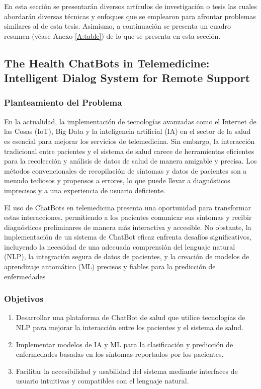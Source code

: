 En esta sección se presentarán diversos artículos de investigación o tesis las cuales abordarán diversas técnicas y enfoques que se emplearon para afrontar problemas similares al de esta tesis. Asimismo, a continuación se presenta un cuadro resumen (véase Anexo \ref{A:table}) de lo que se presenta en esta sección.


\subsection{The Health ChatBots in Telemedicine: Intelligent Dialog System for Remote Support \citep*{HealthChatBots-2022}}
	\subsubsection{Planteamiento del Problema}
		En la actualidad, la implementación de tecnologías avanzadas como el Internet de las Cosas (IoT), Big Data y la inteligencia artificial (IA) en el sector de la salud es esencial para mejorar los servicios de telemedicina. Sin embargo, la interacción tradicional entre pacientes y el sistema de salud carece de herramientas eficientes para la recolección y análisis de datos de salud de manera amigable y precisa. Los métodos convencionales de recopilación de síntomas y datos de pacientes son a menudo tediosos y propensos a errores, lo que puede llevar a diagnósticos imprecisos y a una experiencia de usuario deficiente.
		
		El uso de ChatBots en telemedicina presenta una oportunidad para transformar estas interacciones, permitiendo a los pacientes comunicar sus síntomas y recibir diagnósticos preliminares de manera más interactiva y accesible. No obstante, la implementación de un sistema de ChatBot eficaz enfrenta desafíos significativos, incluyendo la necesidad de una adecuada comprensión del lenguaje natural (NLP), la integración segura de datos de pacientes, y la creación de modelos de aprendizaje automático (ML) precisos y fiables para la predicción de enfermedades
	
	\subsubsection{Objetivos}
		\begin{enumerate}
			\item Desarrollar una plataforma de ChatBot de salud que utilice tecnologías de NLP para mejorar la interacción entre los pacientes y el sistema de salud.\vspace{-2mm}
			\item Implementar modelos de IA y ML para la clasificación y predicción de enfermedades basadas en los síntomas reportados por los pacientes.\vspace{-2mm}
			\item Facilitar la accesibilidad y usabilidad del sistema mediante interfaces de usuario intuitivas y compatibles con el lenguaje natural.\vspace{-2mm}
		\end{enumerate}
			
